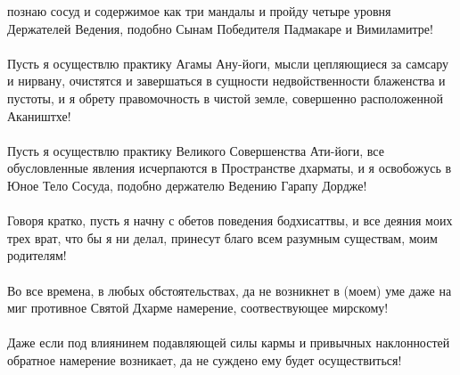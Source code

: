 познаю сосуд и содержимое как три мандалы и пройду четыре
уровня Держателей Ведения, подобно Сынам Победителя
Падмакаре и Вимиламитре!\\
\\
Пусть я осуществлю практику Агамы Ану-йоги, мысли
цепляю\-щиеся за самсару и нирвану, очистятся и завершаться
в сущности недвойственности блаженства и пустоты,
и я обрету правомочность в чистой земле, совершенно расположенной Акаништхе!\\
\\
Пусть я осуществлю практику Великого Совершенства Ати-йоги,
все обусловленные явления исчерпаются в Пространстве дхарматы,
и я освобожусь в Юное Тело Сосуда, подобно держателю Ведению Гарапу Дордже!\\
\\
Говоря кратко, пусть я начну с обетов поведения бодхисаттвы,
и все деяния моих трех врат, что бы я ни делал,
принесут благо всем разумным существам, моим родителям!\\
\\
Во все времена, в любых обстоятельствах, да не возникнет
в (моем) уме даже на миг противное Святой Дхарме намерение, соотвествующее мирскому!\\
\\
Даже если под влиянинем подавляющей силы кармы и привыч\-ных наклонностей 
обратное намерение возникает, да не сужде\-но ему будет осуществиться!\\

